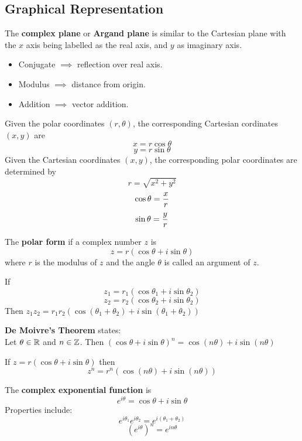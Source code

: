 \documentclass[english, 12pt]{article}
\begin{document}
\subsection{Graphical Representation}
\begin{defn}
The \textbf{complex plane} or \textbf{Argand plane} is similar to the Cartesian plane with the $x$ axis being labelled as the real axis, and $y$ as imaginary axis.
\end{defn}
\begin{itemize}
\item Conjugate $\implies$ reflection over real axis.
\item Modulus $\implies $ distance from origin.
\item Addition $\implies$ vector addition.
\end{itemize}
\begin{defn}
Given the polar coordinates $(r,\theta)$, the corresponding Cartesian cordinates $(x,y)$ are
\[ x = r \cos \theta\]
\[ y = r \sin \theta\]
Given the Cartesian coordinates $(x,y)$, the corresponding polar coordinates are determined by 
\[ r = \sqrt{x^2 + y^2}\]
\[ \cos \theta = \frac{x}{r}\]
\[ \sin \theta = \frac{y}{r}\]
\end{defn}
\begin{defn}
The \textbf{polar form} if a complex number $z$ is 
\[z = r (\cos \theta + i \sin \theta)\]
where $r$ is the modulus of $z$ and the angle $\theta$ is called an argument of $z$.
\end{defn}
\begin{thrm}
If
\[ z_{1} = r_{1} (\cos \theta_{1} + i \sin \theta_{2}) \]
\[ z_{2} = r_{2} (\cos \theta_{2} + i \sin \theta_{2}) \]
Then $z_{1} z_{2} = r_{1} r_{2} (\cos (\theta_{1} + \theta_{2}) + i \sin (\theta_{1} + \theta_{2}))$
\end{thrm}
\begin{thrm}[DMT]
\textbf{De Moivre's Theorem} states: \\
Let $\theta \in {\mathbb{R}}$ and $n \in {\mathbb{Z}}$. Then $(\cos \theta + i \sin \theta)^n = \cos (n\theta) + i \sin(n\theta)$
\end{thrm}
\begin{cor}
If $z = r (\cos \theta + i \sin \theta)$ then 
\[z^n = r^n (\cos (n\theta) + i \sin(n\theta)) \]
\end{cor}
\begin{defn}
The \textbf{complex exponential function} is
\[ e^{i\theta} = \cos \theta + i \sin \theta \]
Properties include:
\[e^{i\theta_{1}} e^{i\theta_{2}} = e^{i(\theta_{1} + \theta_{2})} \]
\[ (e^{i\theta})^n = e^{in\theta} \]

\end{defn}
\end{document}
